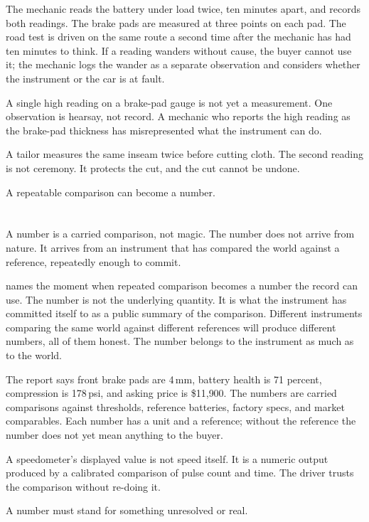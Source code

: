 The mechanic reads the battery under load twice, ten minutes apart, and
records both readings. The brake pads are measured at three points on each
pad. The road test is driven on the same route a second time after the
mechanic has had ten minutes to think. If a reading wanders without cause,
the buyer cannot use it; the mechanic logs the wander as a separate
observation and considers whether the instrument or the car is at fault.

A single high reading on a brake-pad gauge is not yet a measurement. One
observation is hearsay, not record. A mechanic who reports the high reading
as the brake-pad thickness has misrepresented what the instrument can do.

A tailor measures the same inseam twice before cutting cloth. The second
reading is not ceremony. It protects the cut, and the cut cannot be
undone.

A repeatable comparison can become a number.

\section{}
\label{se:numeric}

A number is a carried comparison, not magic. The number does not arrive
from nature. It arrives from an instrument that has compared the world
against a reference, repeatedly enough to commit.

 names the moment when repeated comparison becomes a number
the record can use. The number is not the underlying quantity. It is what
the instrument has committed itself to as a public summary of the
comparison. Different instruments comparing the same world against
different references will produce different numbers, all of them honest.
The number belongs to the instrument as much as to the world.

The report says front brake pads are 4{\,}mm, battery health is 71
percent, compression is 178{\,}psi, and asking price is \$11{,}900. The
numbers are carried comparisons against thresholds, reference batteries,
factory specs, and market comparables. Each number has a unit and a
reference; without the reference the number does not yet mean anything to
the buyer.

A speedometer's displayed value is not speed itself. It is a numeric
output produced by a calibrated comparison of pulse count and time. The
driver trusts the comparison without re-doing it.

A number must stand for something unresolved or real.

